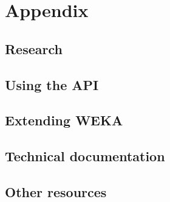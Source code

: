 \documentclass[a4paper]{book}
\begin{document}
\part{Appendix}
\chapter{Research}


\chapter{Using the API}


\chapter{Extending WEKA}


\chapter{Technical documentation}


\chapter{Other resources}



\end{document}
